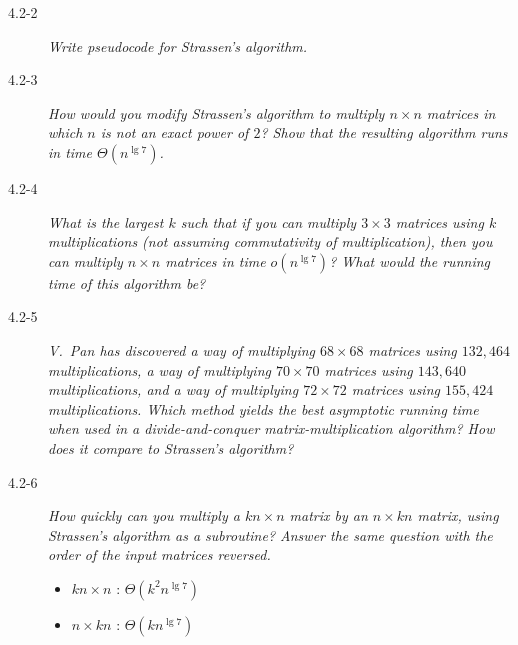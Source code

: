 \begin{description}
  \item[4.2-2] {\itshape Write pseudocode for Strassen’s algorithm.}
    \begin{exrev}
      
    \end{exrev}

  \item[4.2-3]{\itshape How would you modify Strassen’s algorithm to multiply $n \times n$ matrices in which $n$ is not an exact power of $2$? Show that the resulting algorithm runs in time $\Theta (n^{\lg 7})$.}
    \begin{exrev}
      
    \end{exrev}
  \item[4.2-4]{\itshape What is the largest $k$ such that if you can multiply $3 \times 3$ matrices using $k$ multiplications (not assuming commutativity of multiplication), then you can multiply $n \times n$ matrices in time $o(n^{\lg 7})$? What would the running time of this algorithm be?}

    \begin{exrev}
      
    \end{exrev}
  \item[4.2-5]{\itshape V.~Pan has discovered a way of multiplying $68\times 68$ matrices using $132,464$ multiplications, a way of multiplying $70\times 70$ matrices using $143,640$ multiplications, and a way of multiplying $72\times 72$ matrices using $155,424$ multiplications. Which method yields the best asymptotic running time when used in a divide-and-conquer matrix-multiplication algorithm? How does it compare to Strassen’s algorithm?}

    \begin{exrev}
      
    \end{exrev}

  \item[4.2-6]{\itshape How quickly can you multiply a $kn\times n$ matrix by an $n\times kn$ matrix, using Strassen’s algorithm as a subroutine? Answer the same question with the order of the input matrices reversed.}

    \begin{ex}   %
      \begin{itemize}
        \item $kn \times n$ : $\Theta(k^2 n^{\lg 7})$
        \item $n \times kn$ : $\Theta(kn^{\lg 7})$
      \end{itemize}
    \end{ex}


\end{description}
